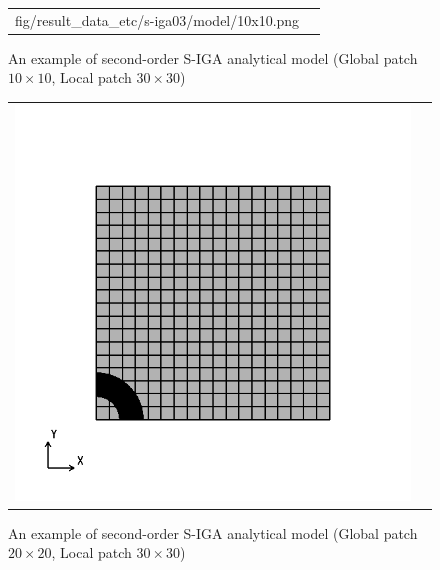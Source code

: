 \begin{figure}[htbp]
\begin{tabular}{cc}
\begin{minipage}[t]{0.45\hsize}
      {fig/result_data_etc/s-iga03/model/10x10.png}
      \caption{An example of second-order S-IGA analytical model (Global patch $10\times 10$, Local patch $30\times 30$)}
      \label{fig:s-iga03 model02}
    \end{minipage}
  \end{tabular}
\end{figure}

\newpage

\begin{figure}[htbp]
  \begin{tabular}{cc}
    \begin{minipage}[t]{0.45\hsize}
      \centering
      \includegraphics[keepaspectratio, scale=0.3]
      {fig/result_data_etc/s-iga03/model/20x20.png}
      \caption{An example of second-order S-IGA analytical model (Global patch $20\times 20$, Local patch $30\times 30$)}
      \label{fig:s-iga03 model03}
    \end{minipage} &
    \begin{minipage}[t]{0.45\hsize}
      \centering

\end{minipage}
\end{tabular}
\end{figure}
